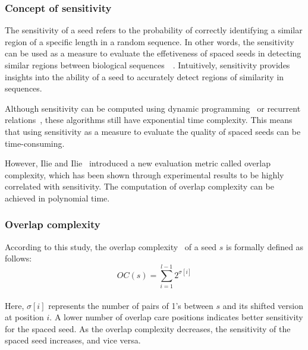 \documentclass{PHlab-thesis}
\begin{document}
\subsubsection{Concept of sensitivity}
The sensitivity of a seed refers to the probability of correctly identifying a similar region of a specific length in a random sequence. In other words, the sensitivity can be used as a measure to evaluate the effetiveness of spaced seeds in detecting similar regions between biological sequences~\cite{haimo2023MaskedPanGenie}~\cite{MaB2002PatternHunter}. Intuitively, sensitivity provides insights into the ability of a seed to accurately detect regions of similarity in sequences.

Although sensitivity can be computed using dynamic programming~\cite{MA2007complexitySpaced} or recurrent relations~\cite{Choi2004recurrent}, these algorithms still have exponential time complexity. This means that using sensitivity as a measure to evaluate the quality of spaced seeds can be time-consuming.

However, Ilie and Ilie~\cite{Ilie2007SpacedSeed} introduced a new evaluation metric called overlap complexity, which has been shown through experimental results to be highly correlated with sensitivity. The computation of overlap complexity can be achieved in polynomial time.
\subsubsection{Overlap complexity}
According to this study, the overlap complexity~\cite{Ilie2007Long} of a seed $s$ is formally defined as follows:
\begin{equation}
    OC(s) = \sum\limits_{i = 1}^{l-1}2^{\sigma[i]}
\end{equation}\\Here, $\sigma[i]$ represents the number of pairs of 1's between $s$ and its shifted version at position $i$. A lower number of overlap care positions indicates better sensitivity for the spaced seed. As the overlap complexity decreases, the sensitivity of the spaced seed increases, and vice versa.
\end{document}
